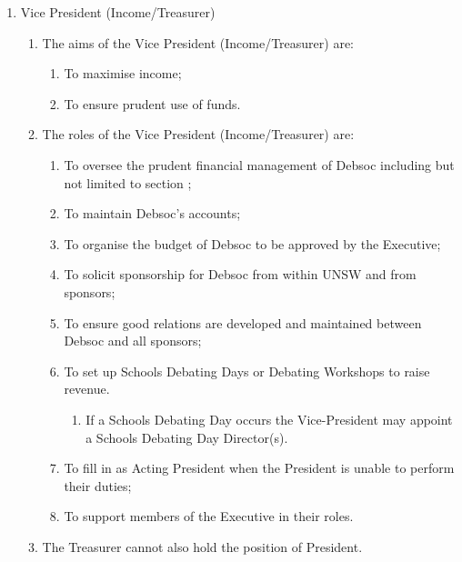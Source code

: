 \begin{enumerate}
\item Vice President (Income/Treasurer)
  \begin{enumerate}
  \item The aims of the Vice President (Income/Treasurer) are:
    \begin{enumerate}
    \item To maximise income;
    \item To ensure prudent use of funds.
    \end{enumerate}
  \item The roles of the Vice President (Income/Treasurer) are:
    \begin{enumerate}
    \item To oversee the prudent financial management of Debsoc including but not limited to section ;
    \item To maintain Debsoc’s accounts;
    \item To organise the budget of Debsoc to be approved by the Executive;
    \item To solicit sponsorship for Debsoc from within UNSW and from sponsors;
    \item To ensure good relations are developed and maintained between Debsoc and all sponsors;
    \item To set up Schools Debating Days or Debating Workshops to raise revenue.
      \begin{enumerate}
      \item If a Schools Debating Day occurs the Vice-President may appoint a Schools Debating Day Director(s).
      \end{enumerate}
    \item To fill in as Acting President when the President is unable to perform their duties;
    \item To support members of the Executive in their roles.
    \end{enumerate}
  \item The Treasurer cannot also hold the position of President.
  \end{enumerate}


\end{enumerate}
